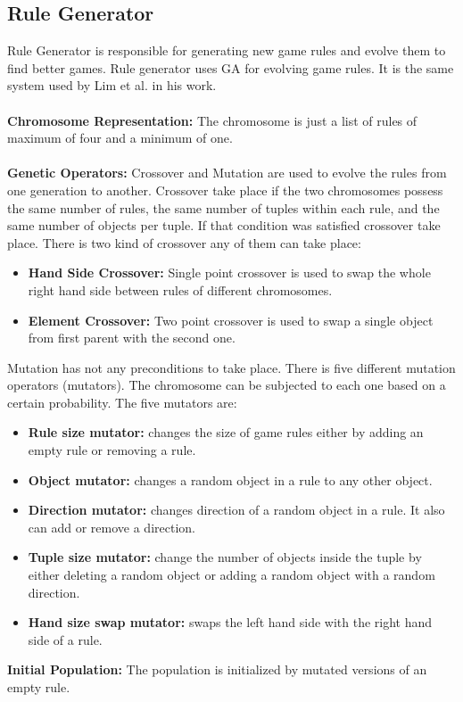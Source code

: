 \subsection{Rule Generator}
Rule Generator is responsible for generating new game rules and evolve them to find better games. Rule generator uses GA for evolving game rules. It is the same system used by Lim et al.\cite{puzzleScriptGeneration} in his work.\\\\
\textbf{Chromosome Representation:} The chromosome is just a list of rules of maximum of four and a minimum of one.\\\\
\textbf{Genetic Operators:} Crossover and Mutation are used to evolve the rules from one generation to another. Crossover take place if the two chromosomes possess the same number of rules, the same number of tuples within each rule, and the same number of objects per tuple. If that condition was satisfied crossover take place. There is two kind of crossover any of them can take place:
\begin{itemize} \itemsep0pt \parskip0pt 
	\item \textbf{Hand Side Crossover:} Single point crossover is used to swap the whole right hand side between rules of different chromosomes.
	\item \textbf{Element Crossover:} Two point crossover is used to swap a single object from first parent with the second one.
\end{itemize}
Mutation has not any preconditions to take place. There is five different mutation operators (mutators). The chromosome can be subjected to each one based on a certain probability. The five mutators are:
\begin{itemize} \itemsep0pt \parskip0pt 
	\item \textbf{Rule size mutator:} changes the size of game rules either by adding an empty rule or removing a rule.
	\item \textbf{Object mutator:} changes a random object in a rule to any other object.
	\item \textbf{Direction mutator:} changes direction of a random object in a rule. It also can add or remove a direction.
	\item \textbf{Tuple size mutator:} change the number of objects inside the tuple by either deleting a random object or adding a random object with a random direction.
	\item \textbf{Hand size swap mutator:} swaps the left hand side with the right hand side of a rule.
\end{itemize}
\textbf{Initial Population:} The population is initialized by mutated versions of an empty rule.

